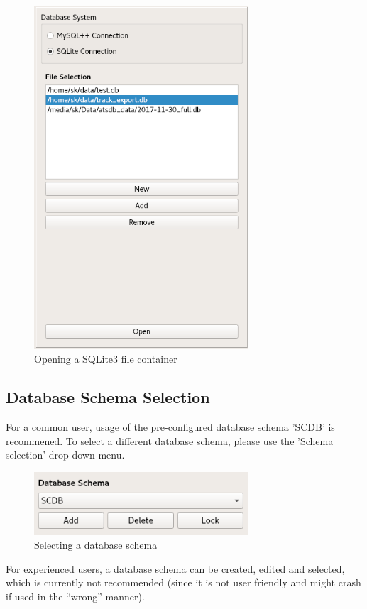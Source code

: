 \begin{figure}[H]
  \center
    \includegraphics[width=8cm,frame]{../screenshots/sqlite3_open.png}
  \caption{Opening a SQLite3 file container}
  \label{fig:sqlite3_open}
\end{figure}

\subsection{Database Schema Selection}
For a common user, usage of the pre-configured database schema 'SCDB' is recommened. To select a different database schema, please use the 'Schema selection' drop-down menu.\\

\begin{figure}[H]
  \center
    \includegraphics[width=8cm,frame]{../screenshots/database_schema_selection.png}
  \caption{Selecting a database schema}
  \label{fig:db_schema_select}
\end{figure}

For experienced users, a database schema can be created, edited and selected, which is currently not recommended (since it is not user friendly and might crash if used in the ``wrong'' manner).

